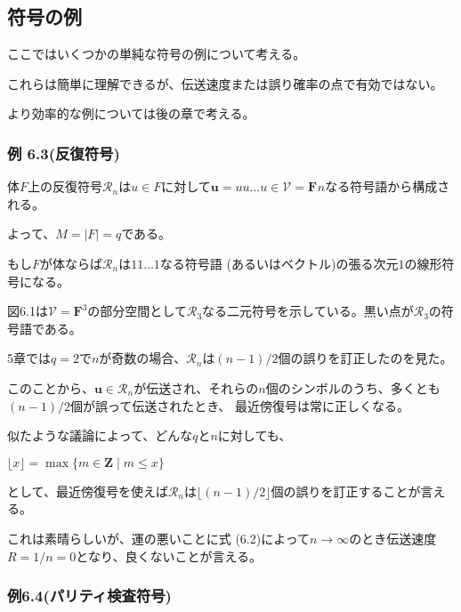 \documentclass[12pt,a4paper]{article}
\begin{document}
\subsection*{符号の例}\label{ux7b26ux53f7ux306eux4f8b}

ここではいくつかの単純な符号の例について考える。

これらは簡単に理解できるが、伝送速度または誤り確率の点で有効ではない。

より効率的な例については後の章で考える。

\subsubsection*{例
6.3(反復符号)}\label{ux4f8b-6.3ux53cdux5fa9ux7b26ux53f7}

体\(F\)上の反復符号\(\mathcal{R}_n\)は\(u \in F\)に対して$
\mathbf{u} = uu\dots u \in \mathcal{V} =
\mathbf{F}^{}n$なる符号語から構成される。

よって、\(M = \mid F \mid = q\)である。

もし\(F\)が体ならば\(\mathcal{R}_n\)は\(11\dots 1\)なる符号語 (あるいはベクトル)の張る次元\(1\)の線形符号になる。

図6.1は\(\mathcal{V} = \mathbf{F}^3\)の部分空間として\(\mathcal{R}_3\)なる二元符号を示している。黒い点が\(\mathcal{R}_3\)の符号語である。

5章では\(q = 2\)で\(n\)が奇数の場合、\(\mathcal{R}_n\)は\((n -1) /2\)個の誤りを訂正したのを見た。

このことから、\(\mathbf{u} \in \mathcal{R}_n\)が伝送され、それらの\(n\)個のシンボルのうち、多くとも\((n-1)/2\)個が誤って伝送されたとき、
最近傍復号は常に正しくなる。

似たような議論によって、どんな\(q\)と\(n\)に対しても、

\(\lfloor x \rfloor = \max {\lbrace m \in \mathbf{Z} \mid m \leq x \rbrace}\)

として、最近傍復号を使えば\(\mathcal{R}_n\)は\(\lfloor (n - 1) / 2 \rfloor\)個の誤りを訂正することが言える。

これは素晴らしいが、運の悪いことに式 (6.2)によって\(n \rightarrow \infty\)のとき伝送速度\(R = 1 / n = 0\)となり、良くないことが言える。

\subsubsection*{例6.4(パリティ検査符号)}\label{ux4f8b6.4ux30d1ux30eaux30c6ux30a3ux691cux67fbux7b26ux53f7}
\end{document}
